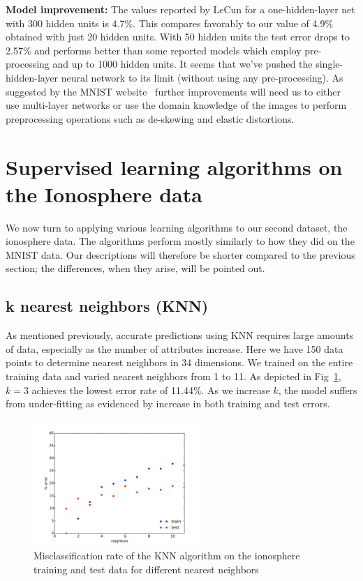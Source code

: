 \documentclass[10pt,letterpaper]{article}
\begin{document}
{\bf Model improvement:} The values reported by LeCun for a one-hidden-layer net with 300 hidden units is 4.7\%. This compares favorably to our value of 4.9\% obtained with just 20 hidden units. With 50 hidden units the test error drops to 2.57\% and performs better than some reported models which employ pre-processing and up to 1000 hidden units\cite{mnist}. It seems that we've pushed the single-hidden-layer neural network to its limit (without using any pre-processing). As suggested by the MNIST website~\cite{mnist} further improvements will need us to either use multi-layer networks or use the domain knowledge of the images to perform preprocessing operations such as de-skewing and elastic distortions. 
\section{Supervised learning algorithms on the Ionosphere data}
We now turn to applying various learning algorithms to our second dataset, the ionosphere data. The algorithms perform mostly similarly to how they did on the MNIST data. Our descriptions will therefore be shorter compared to the previous section; the differences, when they arise, will be pointed out. 
\subsection{k nearest neighbors (KNN)}
As mentioned previously, accurate predictions using KNN requires large amounts of data, especially as the number of attributes increase. Here  we have 150 data points to determine nearest neighbors in 34 dimensions. We trained on the entire training data and varied nearest neighbors from 1 to 11. As depicted in Fig~\ref{knnion1}, $k=3$ achieves the lowest error rate of 11.44\%. As we increase $k$, the model suffers from under-fitting as evidenced by increase in both training and test errors. 
\begin{figure}[!tbp]
	\begin{center}
	\includegraphics[width=2.5in]{../results/ionosphere/knn/error_vs_nbrs.pdf}
	\end{center}
	\caption{Misclassification rate of the KNN algorithm on the ionosphere training and test data for different nearest neighbors\label{knnion1}}
\end{figure}
\end{document}
